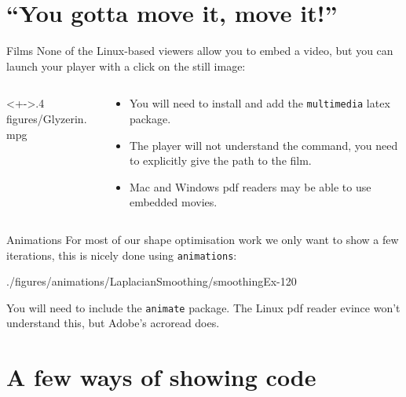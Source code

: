 \section[Animation]{``You gotta move it, move it!''}

\begin{frame}{Films}
  None of the Linux-based viewers allow you to embed a video, but
  you can launch your player with a click on the still image:

  \begin{columns}
    \begin{column}<+->{.4\textwidth}
      {figures/Glyzerin.mpg}
    \end{column}
    \begin{column}{.59\textwidth}
      \begin{itemize}
      \item You will need to install and add the {\tt multimedia}
      latex package.
        
      \item The player will not understand the 
      command, you need to explicitly give the path to the film.
    \item Mac and Windows pdf readers may be able to use embedded
      movies.
      \end{itemize}
    \end{column}
  \end{columns}

\end{frame}

\begin{frame}{Animations}
  For most of our shape optimisation work we only want to 
  show a few iterations, this is nicely done using {\tt animations}:

\centerline{
    {./figures/animations/LaplacianSmoothing/smoothingEx-}{1}{20}
  }
  You will need to include the {\tt animate} package.
  The Linux pdf reader evince won't understand this, but 
  Adobe's acroread does.  


\end{frame}

\section[Code]{A few ways of showing code}


